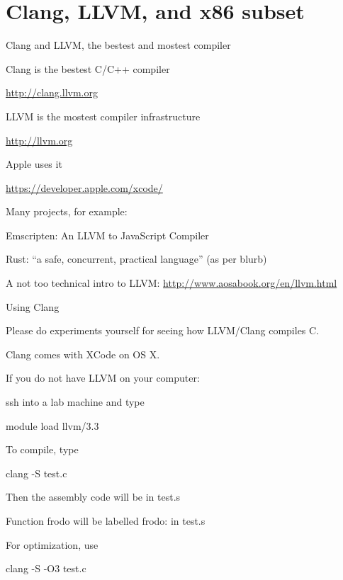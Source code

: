 \documentclass[landscape]{beamer}
\begin{document}
\section{Clang, LLVM, and x86 subset}

\begin{frame}{Clang and LLVM, the bestest and mostest compiler}

Clang is the bestest C/C++ compiler

\url{http://clang.llvm.org}

LLVM  is the mostest compiler infrastructure

\url{http://llvm.org}

Apple uses it

\url{https://developer.apple.com/xcode/}

Many projects, for example:

Emscripten: An LLVM to JavaScript Compiler

Rust: ``a safe, concurrent, practical language'' (as per blurb)

A not too technical intro to LLVM:
\url{http://www.aosabook.org/en/llvm.html}

\end{frame}

\begin{frame}{Using Clang}

Please do experiments yourself for seeing how LLVM/Clang compiles C.

Clang comes with XCode on OS X.

If you do not have LLVM on your computer:

ssh into a lab machine and type 

module load llvm/3.3

To compile, type

clang -S test.c

Then the assembly code will be in test.s

Function frodo will be labelled frodo: in test.s

For optimization, use

clang -S -O3 test.c

\end{frame}


\end{document}
